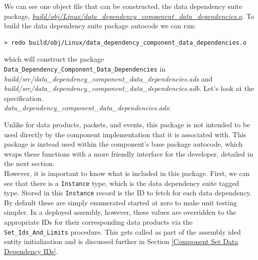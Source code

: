 We can see one object file that can be constructed, the data dependency suite package, \textit{\url{build/obj/Linux/data\_dependency\_component\_data\_dependencies.o}}. To build the data dependency suite package autocode we can run:

\vspace{5mm} %
\begin{verbatim}
> redo build/obj/Linux/data_dependency_component_data_dependencies.o
\end{verbatim}
\vspace{5mm} %

which will construct the package \texttt{Data\_Dependency\_Component\_Data\_Dependencies} in \textit{build/src/data\_dependency\_component\_data\_dependencies.ads} and \textit{build/src/data\_dependency\_component\_data\_dependencies.adb}. Let's look at the specification. \\

\textit{data\_dependency\_component\_data\_dependencies.ads}:

Unlike for data products, packets, and events, this package is not intended to be used directly by the component implementation that it is associated with. This package is instead used within the component's base package autocode, which wraps these functions with a more friendly interface for the developer, detailed in the next section. \\

However, it is important to know what is included in this package. First, we can see that there is a \texttt{Instance} type, which is the data dependency suite tagged type. Stored in this \texttt{Instance} record is the ID to fetch for each data dependency. By default these are simply enumerated started at zero to make unit testing simpler. In a deployed assembly, however, these values are overridden to the appropriate IDs for their corresponding data products via the \texttt{Set\_Ids\_And\_Limits} procedure. This gets called as part of the assembly ided entity initialization and is discussed further in Section \ref{Component Set Data Dependency IDs}. \\


